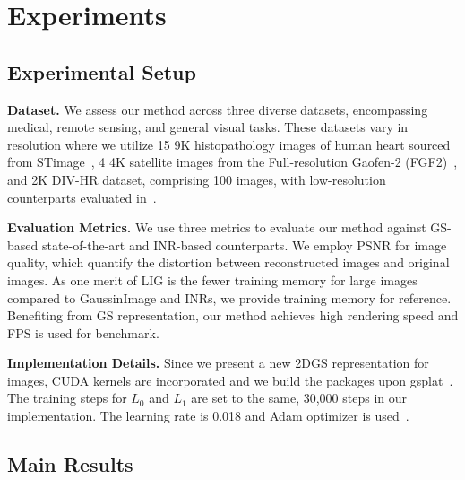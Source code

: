 \section{Experiments}

\subsection{Experimental Setup}
\textbf{Dataset.} 
We assess our method across three diverse datasets, encompassing medical, remote sensing, and general visual tasks. These datasets vary in resolution where we utilize 15 9K histopathology images of human heart sourced from STimage~\cite{chen2024stimage1k4m}, 4 4K satellite images from the Full-resolution Gaofen-2 (FGF2)~\cite{wang2024cross}, and 2K DIV-HR dataset, comprising 100 images, with low-resolution counterparts evaluated in~\cite{zhang2024gaussianimage}.

\noindent \textbf{Evaluation Metrics.} We use three metrics to evaluate our method against GS-based state-of-the-art and INR-based counterparts. We employ PSNR for image quality, which quantify the distortion between reconstructed images and original images. As one merit of LIG is the fewer training memory for large images compared to GaussinImage and INRs, we provide training memory for reference. Benefiting from GS representation, our method achieves high rendering speed and FPS is used for benchmark.

\noindent \textbf{Implementation Details.} Since we present a new 2DGS representation for images, CUDA kernels are incorporated and we build the packages upon gsplat~\cite{ye2023mathematical}. The training steps for $L_0$ and $L_1$ are set to the same, 30,000 steps in our implementation. The learning rate is 0.018 and Adam optimizer is used~\cite{kingma2014adam}.

\subsection{Main Results}

